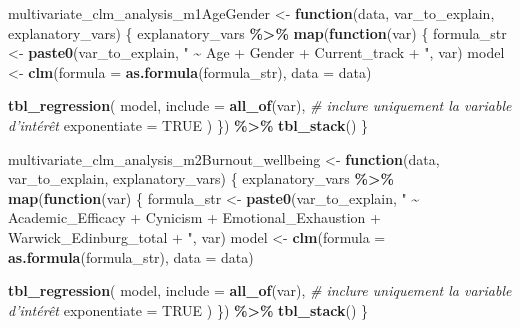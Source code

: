 \documentclass[
]{article}
\newenvironment{Shaded}{\begin{snugshade}}{\end{snugshade}}
\newcommand{\AttributeTok}[1]{\textcolor[rgb]{0.13,0.29,0.53}{#1}}
\newcommand{\CommentTok}[1]{\textcolor[rgb]{0.56,0.35,0.01}{\textit{#1}}}
\newcommand{\ConstantTok}[1]{\textcolor[rgb]{0.56,0.35,0.01}{#1}}
\newcommand{\ControlFlowTok}[1]{\textcolor[rgb]{0.13,0.29,0.53}{\textbf{#1}}}
\newcommand{\FunctionTok}[1]{\textcolor[rgb]{0.13,0.29,0.53}{\textbf{#1}}}
\newcommand{\NormalTok}[1]{#1}
\newcommand{\OtherTok}[1]{\textcolor[rgb]{0.56,0.35,0.01}{#1}}
\newcommand{\SpecialCharTok}[1]{\textcolor[rgb]{0.81,0.36,0.00}{\textbf{#1}}}
\newcommand{\StringTok}[1]{\textcolor[rgb]{0.31,0.60,0.02}{#1}}
\begin{document}
\begin{Shaded}
\begin{Highlighting}[]
\NormalTok{multivariate\_clm\_analysis\_m1AgeGender }\OtherTok{\textless{}{-}} \ControlFlowTok{function}\NormalTok{(data, var\_to\_explain, explanatory\_vars) \{}
\NormalTok{  explanatory\_vars }\SpecialCharTok{\%\textgreater{}\%}
    \FunctionTok{map}\NormalTok{(}\ControlFlowTok{function}\NormalTok{(var) \{}
\NormalTok{      formula\_str }\OtherTok{\textless{}{-}} \FunctionTok{paste0}\NormalTok{(var\_to\_explain, }\StringTok{" \textasciitilde{} Age + Gender + Current\_track + "}\NormalTok{, var)}
\NormalTok{      model }\OtherTok{\textless{}{-}} \FunctionTok{clm}\NormalTok{(}\AttributeTok{formula =} \FunctionTok{as.formula}\NormalTok{(formula\_str), }\AttributeTok{data =}\NormalTok{ data)}
      
      \FunctionTok{tbl\_regression}\NormalTok{(}
\NormalTok{        model,}
        \AttributeTok{include =} \FunctionTok{all\_of}\NormalTok{(var),  }\CommentTok{\# inclure uniquement la variable d’intérêt}
        \AttributeTok{exponentiate =} \ConstantTok{TRUE}
\NormalTok{      )}
\NormalTok{    \}) }\SpecialCharTok{\%\textgreater{}\%}
    \FunctionTok{tbl\_stack}\NormalTok{()}
\NormalTok{\}}




\NormalTok{multivariate\_clm\_analysis\_m2Burnout\_wellbeing }\OtherTok{\textless{}{-}}
  \ControlFlowTok{function}\NormalTok{(data, var\_to\_explain, explanatory\_vars) \{}
\NormalTok{  explanatory\_vars }\SpecialCharTok{\%\textgreater{}\%}
    \FunctionTok{map}\NormalTok{(}\ControlFlowTok{function}\NormalTok{(var) \{}
\NormalTok{      formula\_str }\OtherTok{\textless{}{-}} \FunctionTok{paste0}\NormalTok{(var\_to\_explain, }\StringTok{" \textasciitilde{} Academic\_Efficacy + Cynicism + Emotional\_Exhaustion + Warwick\_Edinburg\_total + "}\NormalTok{, var)}
\NormalTok{      model }\OtherTok{\textless{}{-}} \FunctionTok{clm}\NormalTok{(}\AttributeTok{formula =} \FunctionTok{as.formula}\NormalTok{(formula\_str), }\AttributeTok{data =}\NormalTok{ data)}
      
      \FunctionTok{tbl\_regression}\NormalTok{(}
\NormalTok{        model,}
        \AttributeTok{include =} \FunctionTok{all\_of}\NormalTok{(var),  }\CommentTok{\# inclure uniquement la variable d’intérêt}
        \AttributeTok{exponentiate =} \ConstantTok{TRUE}
\NormalTok{      )}
\NormalTok{    \}) }\SpecialCharTok{\%\textgreater{}\%}
    \FunctionTok{tbl\_stack}\NormalTok{()}
\NormalTok{\}}
\end{Highlighting}
\end{Shaded}
\end{document}
